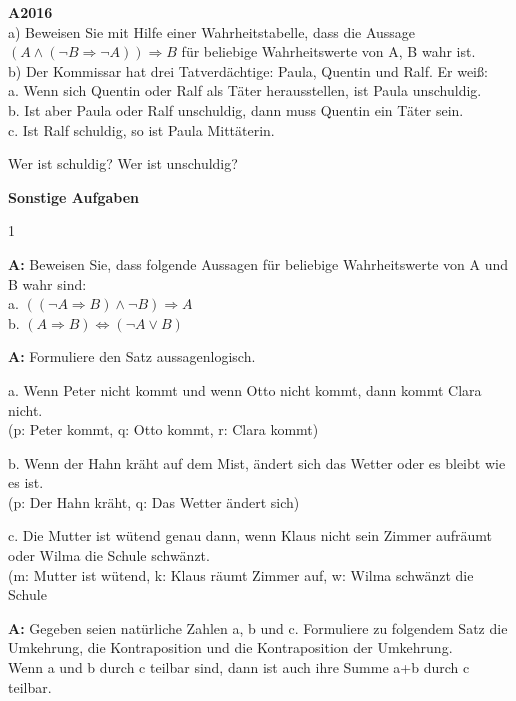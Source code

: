 \documentclass[landscape,twocolumn,a4paper]{article}
\begin{document}
\textbf{A2016} \\

a) Beweisen Sie mit Hilfe einer Wahrheitstabelle, dass die Aussage
$(A \land ( \lnot B \Rightarrow \lnot A)) \Rightarrow B$
für beliebige Wahrheitswerte von A, B wahr ist. \\

b) Der Kommissar hat drei Tatverdächtige: Paula, Quentin und Ralf. Er weiß: \\
a. Wenn sich Quentin oder Ralf als Täter herausstellen, ist Paula unschuldig. \\
b. Ist aber Paula oder Ralf unschuldig, dann muss Quentin ein Täter sein. \\
c. Ist Ralf schuldig, so ist Paula Mittäterin.

Wer ist schuldig? Wer ist unschuldig?
\bigskip


\textbf{Sonstige Aufgaben}
\bigskip

\setcounter {y} {1}


\textbf{A:}
Beweisen Sie, dass folgende Aussagen für beliebige Wahrheitswerte von A und B wahr sind: \\

a. $((\lnot A \Rightarrow B) \land \lnot B) \Rightarrow A$ \\
b. $(A \Rightarrow B) \Leftrightarrow (\lnot A \lor B)$
\bigskip {}

\textbf{A:} 
Formuliere den Satz aussagenlogisch.

a. Wenn Peter nicht kommt und wenn Otto nicht kommt, dann kommt Clara nicht. \\
(p: Peter kommt, q: Otto kommt, r: Clara kommt) 

b. Wenn der Hahn kräht auf dem Mist, ändert sich das Wetter oder es bleibt wie es ist. \\
(p: Der Hahn kräht, q: Das Wetter ändert sich)

c. Die Mutter ist wütend genau dann, wenn Klaus nicht sein Zimmer aufräumt oder Wilma die Schule schwänzt. \\
(m: Mutter ist wütend, k: Klaus räumt Zimmer auf, w: Wilma schwänzt die Schule
\bigskip {}

\textbf{A:} 
Gegeben seien natürliche Zahlen a, b und c.
Formuliere zu folgendem Satz die Umkehrung, die Kontraposition und die Kontraposition der Umkehrung. \\
Wenn a und  b durch c teilbar sind, dann ist auch ihre Summe a+b durch c teilbar.
\bigskip {}
\end{document}
